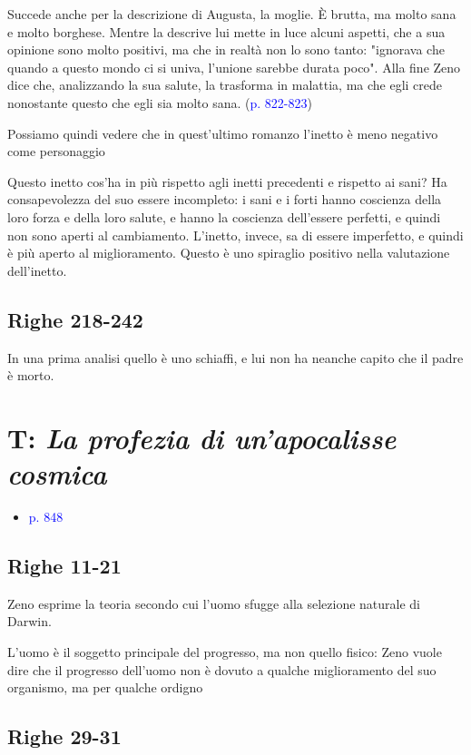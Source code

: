 \documentclass[a4paper, twoside, titlepage]{book}
\newcommand{\elenco}[1]{%
\begin{itemize}
#1
\end{itemize}}
\renewcommand{\emph}[1]{\textcolor{blue}{#1}}
\begin{document}
Succede anche per la descrizione di Augusta, la moglie. È brutta, ma molto sana e molto borghese. Mentre la descrive lui mette in luce alcuni aspetti, che a sua opinione sono molto positivi, ma che in realtà non lo sono tanto: "ignorava che quando a questo mondo ci si univa, l'unione sarebbe durata poco". Alla fine Zeno dice che, analizzando la sua salute, la trasforma in malattia, ma che egli crede nonostante questo che egli sia molto sana. (\emph{p. 822-823})

Possiamo quindi vedere che in quest'ultimo romanzo l'inetto è meno negativo come personaggio

Questo inetto cos'ha in più rispetto agli inetti precedenti e rispetto ai sani? Ha consapevolezza del suo essere incompleto: i sani e i forti hanno coscienza della loro forza e della loro salute, e hanno la coscienza dell'essere perfetti, e quindi non sono aperti al cambiamento.
L'inetto, invece, sa di essere imperfetto, e quindi è più aperto al miglioramento. Questo è uno spiraglio positivo nella valutazione dell'inetto.

\subsection*{Righe 218-242}

In una prima analisi quello è uno schiaffi, e lui non ha neanche capito che il padre è morto.

\section{T: \textit{La profezia di un'apocalisse cosmica}}
\elenco{\item \emph{p. 848}}

\subsection*{Righe 11-21}

Zeno esprime la teoria secondo cui l'uomo sfugge alla selezione naturale di Darwin.

L'uomo è il soggetto principale del progresso, ma non quello fisico: Zeno vuole dire che il progresso dell'uomo non è dovuto a qualche miglioramento del suo organismo, ma per qualche ordigno

\subsection*{Righe 29-31}
\end{document}
